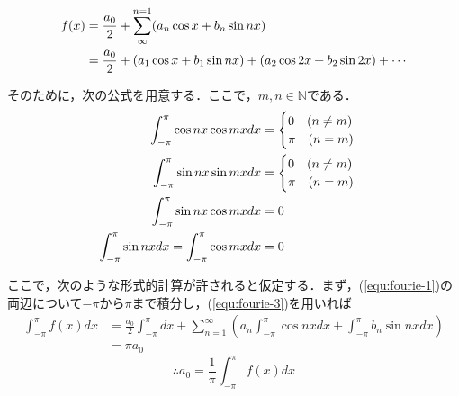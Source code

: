 \documentclass[11pt,a4paper,titlepage]{jsreport}
\theoremstyle{definition}
\begin{document}
\begin{align}
  f(x) & = \frac{a_0}{2} + \sum_{\infty}^{n=1} (a_n \cos x + b_n \sin nx)                       \label{equ:fourie-1} \\
       & = \frac{a_0}{2} + (a_1 \cos x + b_1 \sin nx) + (a_2 \cos 2x + b_2 \sin 2x) + \cdots \notag
\end{align}

そのために，次の公式を用意する．ここで，$m,n\in \mathbb{N}$である．
\begin{align}
  \int_{-\pi}^{\pi} \cos nx \cos mx dx                        & = \begin{cases}
                                                                    0 \quad (n\neq m) \\
                                                                    \pi \quad (n=m)
                                                                  \end{cases} \notag       \\
  \int_{-\pi}^{\pi} \sin nx \sin mx dx                        & = \begin{cases}
                                                                    0 \quad (n\neq m) \\
                                                                    \pi \quad (n=m)   \\
                                                                  \end{cases} \notag       \\
  \int_{-\pi}^{\pi} \sin nx \cos mx dx                        & = 0   \label{equ:fourie-2} \\
  \int_{-\pi}^{\pi} \sin nx dx = \int_{-\pi}^{\pi} \cos mx dx & = 0 \label{equ:fourie-3}
\end{align}

ここで，次のような形式的計算が許されると仮定する．まず，(\ref{equ:fourie-1})の両辺について$-\pi$から$\pi$まで積分し，(\ref{equ:fourie-3})を用いれば
\begin{align*}
  \int_{-\pi}^{\pi} f(x)dx & = \frac{a_0}{2}\int_{-\pi}^{\pi} dx + \sum_{n=1}^{\infty} (a_n \int_{-\pi}^{\pi}\cos nx dx+ \int_{-\pi}^{\pi}b_n \sin nx dx) \\
                           & = \pi a_0
\end{align*}
\begin{equation}
  \label{equ:fourie-a0}
  \therefore a_0 = \frac{1}{\pi}\int_{-\pi}^{\pi} f(x) dx
\end{equation}
\end{document}
